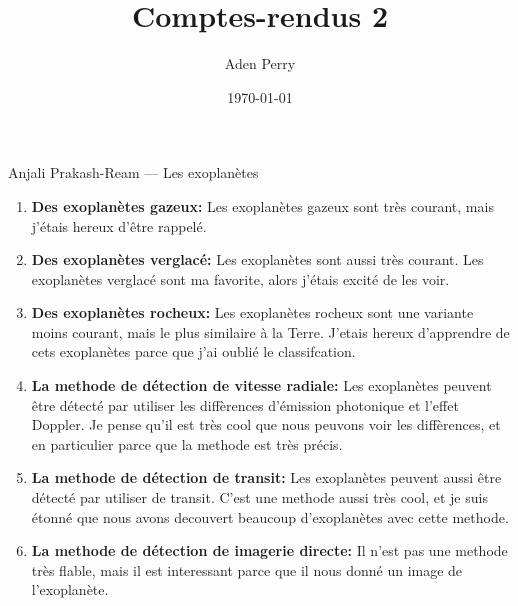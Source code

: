 \documentclass{article}
\title{Comptes-rendus 2}
\author{Aden Perry}
\date{\today}
\begin{document}
\maketitle

Anjali Prakash-Ream --- Les exoplanètes

\begin{enumerate}
	\item \textbf{Des exoplanètes gazeux:} Les exoplanètes gazeux sont très
	      courant, mais j'étais hereux d'être rappelé.
	\item \textbf{Des exoplanètes verglacé:} Les exoplanètes sont aussi très
	      courant. Les exoplanètes verglacé sont ma favorite, alors j'étais
          excité de les voir.
	\item \textbf{Des exoplanètes rocheux:} Les exoplanètes rocheux sont une
	      variante moins courant, mais le plus similaire à la Terre. J'etais
	      hereux d'apprendre de cets exoplanètes parce que j'ai oublié le
	      classifcation.
	\item \textbf{La methode de détection de vitesse radiale:} Les exoplanètes
	      peuvent être détecté par utiliser les diffèrences d'émission
	      photonique et l'effet Doppler. Je pense qu'il est très cool que nous
	      peuvons voir les diffèrences, et en particulier parce que la methode
	      est très précis.
	\item \textbf{La methode de détection de transit:} Les exoplanètes
	      peuvent aussi être détecté par utiliser de transit. C'est une methode
	      aussi très cool, et je suis étonné que nous avons decouvert beaucoup
	      d'exoplanètes avec cette methode.
	\item \textbf{La methode de détection de imagerie directe:} Il n'est pas
	      une methode très flable, mais il est interessant parce que il nous
	      donné un image de l'exoplanète.
\end{enumerate}
\end{document}
